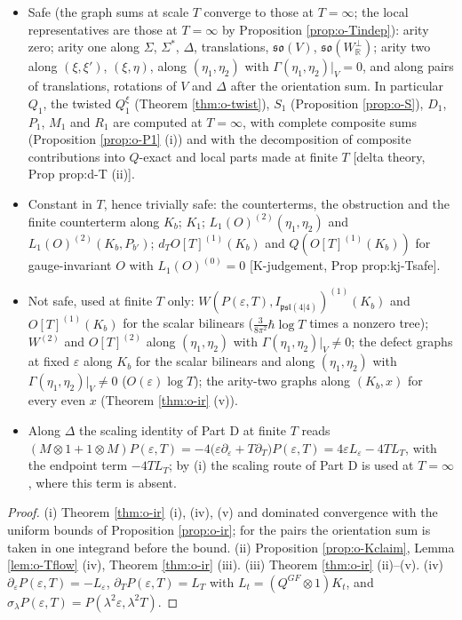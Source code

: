 \begin{proposition}
\label{prop:o-Tsafe}
\begin{itemize}
\item[(i)] Safe (the graph sums at scale $T$ converge to those at $T=\infty$; the local representatives are those at $T=\infty$ by Proposition \ref{prop:o-Tindep}): arity zero; arity one along $\Sigma$, $\Sigma^*$, $\Delta$, translations, $\mathfrak{so}(V)$, $\mathfrak{so}(W_{\mathbb R}^\perp)$; arity two along $(\xi,\xi')$, $(\xi,\eta)$, along $(\eta_1,\eta_2)$ with $\Gamma(\eta_1,\eta_2)|_V=0$, and along pairs of translations, rotations of $V$ and $\Delta$ after the orientation sum. In particular $Q_1$, the twisted $Q^\xi_1$ (Theorem \ref{thm:o-twist}), $S_1$ (Proposition \ref{prop:o-S}), $D_1$, $P_1$, $M_1$ and $R_1$ are computed at $T=\infty$, with complete composite sums (Proposition \ref{prop:o-P1} (i)) and with the decomposition of composite contributions into $Q$-exact and local parts made at finite $T$ [delta theory, Prop prop:d-T (ii)].
\item[(ii)] Constant in $T$, hence trivially safe: the counterterms, the obstruction and the finite counterterm along $K_b$; $K_1$; $L_1(O)^{(2)}(\eta_1,\eta_2)$ and $L_1(O)^{(2)}(K_b,P_{b'})$; $d_TO[T]^{(1)}(K_b)$ and $Q(O[T]^{(1)}(K_b))$ for gauge-invariant $O$ with $L_1(O)^{(0)}=0$ [K-judgement, Prop prop:kj-Tsafe].
\item[(iii)] Not safe, used at finite $T$ only: $W(P(\varepsilon,T),I_{\mathfrak{psl}(4|4)})^{(1)}(K_b)$ and $O[T]^{(1)}(K_b)$ for the scalar bilinears ($\tfrac{3}{8\pi^2}\hbar\log T$ times a nonzero tree); $W^{(2)}$ and $O[T]^{(2)}$ along $(\eta_1,\eta_2)$ with $\Gamma(\eta_1,\eta_2)|_V\neq0$; the defect graphs at fixed $\varepsilon$ along $K_b$ for the scalar bilinears and along $(\eta_1,\eta_2)$ with $\Gamma(\eta_1,\eta_2)|_V\neq0$ ($O(\varepsilon)\log T$); the arity-two graphs along $(K_b,x)$ for every even $x$ (Theorem \ref{thm:o-ir} (v)).
\item[(iv)] Along $\Delta$ the scaling identity of Part D at finite $T$ reads $(M\otimes1+1\otimes M)P(\varepsilon,T)=-4\big(\varepsilon\partial_\varepsilon+T\partial_T\big)P(\varepsilon,T)=4\varepsilon L_\varepsilon-4TL_T$, with the endpoint term $-4TL_T$; by (i) the scaling route of Part D is used at $T=\infty$, where this term is absent.
\end{itemize}
\end{proposition}

\begin{proof}
(i) Theorem \ref{thm:o-ir} (i), (iv), (v) and dominated convergence with the uniform bounds of Proposition \ref{prop:o-ir}; for the pairs the orientation sum is taken in one integrand before the bound. (ii) Proposition \ref{prop:o-Kclaim}, Lemma \ref{lem:o-Tflow} (iv), Theorem \ref{thm:o-ir} (iii). (iii) Theorem \ref{thm:o-ir} (ii)--(v). (iv) $\partial_\varepsilon P(\varepsilon,T)=-L_\varepsilon$, $\partial_TP(\varepsilon,T)=L_T$ with $L_t=(Q^{GF}\otimes1)K_t$, and $\sigma_\lambda P(\varepsilon,T)=P(\lambda^2\varepsilon,\lambda^2T)$.
\end{proof}

